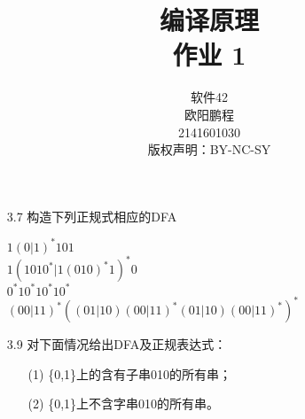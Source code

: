 \documentclass[]{ctexart}
\title{编译原理 \\ 作业 1}
\author{软件42 \\ 欧阳鹏程 \\ 2141601030 \\ 版权声明：BY-NC-SY}
\begin{document}
\maketitle

\begin{enumerate}
	\item[3.7] 构造下列正规式相应的DFA
	\begin{center}
		$1(0|1)^{*}101$ \\
		$1(1010^{*}|1(010)^{*}1)^{*}0$ \\
		$0^{*}10^{*}10^{*}10^{*}$ \\
		$(00|11)^{*}((01|10)(00|11)^{*}(01|10)(00|11)^{*})^{*}$
	\end{center}
	
	
	\item[3.9] 对下面情况给出DFA及正规表达式：
	\begin{enumerate}
		\item[(1)] \{0,1\}上的含有子串010的所有串；
		\item[(2)] \{0,1\}上不含字串010的所有串。
	\end{enumerate}
	
	

\end{enumerate}
\end{document}
